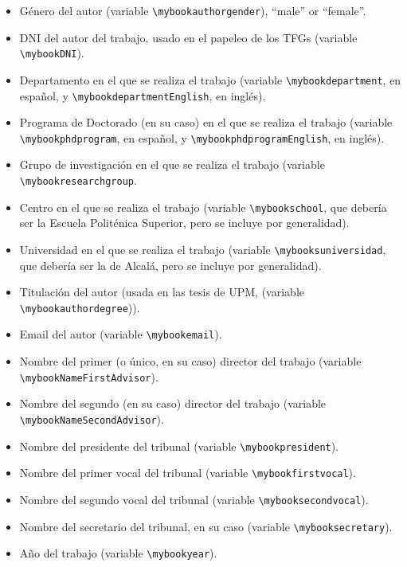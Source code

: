 \begin{itemize}
\item Género del autor (variable
  \texttt{\textbackslash{}mybookauthorgender}), ``male'' or ``female''.

\item DNI del autor del trabajo, usado en el papeleo de los TFGs
  (variable \texttt{\textbackslash{}mybookDNI}).
\item Departamento en el que se realiza el trabajo (variable
  \texttt{\textbackslash{}mybookdepartment}, en español, y
  \texttt{\textbackslash{}mybookdepartmentEnglish}, en inglés).
\item Programa de Doctorado (en su caso) en el que se realiza el trabajo (variable
  \texttt{\textbackslash{}mybookphdprogram}, en español, y
  \texttt{\textbackslash{}mybookphdprogramEnglish}, en inglés). 
\item Grupo de investigación en el que se realiza el trabajo (variable
  \texttt{\textbackslash{}mybookresearchgroup}.
\item Centro en el que se realiza el trabajo (variable \texttt{\textbackslash{}mybookschool}, que debería ser la Escuela Politénica Superior, pero se incluye por generalidad).
\item Universidad en el que se realiza el trabajo (variable \texttt{\textbackslash{}mybooksuniversidad}, que debería ser la de Alcalá, pero se incluye por generalidad).
\item Titulación del autor (usada en las tesis de UPM, (variable \texttt{\textbackslash{}mybookauthordegree})).
\item Email del autor (variable \texttt{\textbackslash{}mybookemail}).
\item Nombre del primer (o único, en su caso) director del trabajo
  (variable \texttt{\textbackslash{}mybookNameFirstAdvisor}).
\item Nombre del segundo (en su caso) director del trabajo (variable \texttt{\textbackslash{}mybookNameSecondAdvisor}).
\item Nombre del presidente del tribunal (variable \texttt{\textbackslash{}mybookpresident}).
\item Nombre del primer vocal del tribunal (variable \texttt{\textbackslash{}mybookfirstvocal}).
\item Nombre del segundo vocal del tribunal (variable \texttt{\textbackslash{}mybooksecondvocal}).
\item Nombre del secretario del tribunal, en su caso (variable \texttt{\textbackslash{}mybooksecretary}).
\item Año del trabajo (variable \texttt{\textbackslash{}mybookyear}).

\end{itemize}
